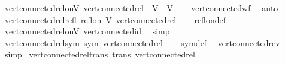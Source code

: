 \begin{isabellebody}
\isanewline
{}\isamarkupfalse%
\ vert{\isacharunderscore}{\kern0pt}connected{\isacharunderscore}{\kern0pt}rel{\isacharunderscore}{\kern0pt}on{\isacharunderscore}{\kern0pt}V{\isacharcolon}{\kern0pt}\ {\isachardoublequoteopen}vert{\isacharunderscore}{\kern0pt}connected{\isacharunderscore}{\kern0pt}rel\ {\isasymsubseteq}\ V\ {\isasymtimes}\ V{\isachardoublequoteclose}\isanewline
%
\isadelimproof
\ \ %
\endisadelimproof
%
\isatagproof
{}\isamarkupfalse%
\ vert{\isacharunderscore}{\kern0pt}connected{\isacharunderscore}{\kern0pt}wf\ \isamarkupfalse%
\ auto%
\endisatagproof
{\isafoldproof}%
%
\isadelimproof
\isanewline
%
\endisadelimproof
\isanewline
{}\isamarkupfalse%
\ vert{\isacharunderscore}{\kern0pt}connected{\isacharunderscore}{\kern0pt}rel{\isacharunderscore}{\kern0pt}refl{\isacharcolon}{\kern0pt}\ {\isachardoublequoteopen}refl{\isacharunderscore}{\kern0pt}on\ V\ vert{\isacharunderscore}{\kern0pt}connected{\isacharunderscore}{\kern0pt}rel{\isachardoublequoteclose}\isanewline
%
\isadelimproof
\ \ %
\endisadelimproof
%
\isatagproof
{}\isamarkupfalse%
\ refl{\isacharunderscore}{\kern0pt}on{\isacharunderscore}{\kern0pt}def\ \isamarkupfalse%
\ vert{\isacharunderscore}{\kern0pt}connected{\isacharunderscore}{\kern0pt}rel{\isacharunderscore}{\kern0pt}on{\isacharunderscore}{\kern0pt}V\ vert{\isacharunderscore}{\kern0pt}connected{\isacharunderscore}{\kern0pt}id\ \isamarkupfalse%
\ simp%
\endisatagproof
{\isafoldproof}%
%
\isadelimproof
\isanewline
%
\endisadelimproof
\isanewline
{}\isamarkupfalse%
\ vert{\isacharunderscore}{\kern0pt}connected{\isacharunderscore}{\kern0pt}rel{\isacharunderscore}{\kern0pt}sym{\isacharcolon}{\kern0pt}\ {\isachardoublequoteopen}sym\ vert{\isacharunderscore}{\kern0pt}connected{\isacharunderscore}{\kern0pt}rel{\isachardoublequoteclose}\isanewline
%
\isadelimproof
\ \ %
\endisadelimproof
%
\isatagproof
{}\isamarkupfalse%
\ sym{\isacharunderscore}{\kern0pt}def\ \isamarkupfalse%
\ vert{\isacharunderscore}{\kern0pt}connected{\isacharunderscore}{\kern0pt}rev\ \isamarkupfalse%
\ simp%
\endisatagproof
{\isafoldproof}%
%
\isadelimproof
\isanewline
%
\endisadelimproof
\isanewline
{}\isamarkupfalse%
\ vert{\isacharunderscore}{\kern0pt}connected{\isacharunderscore}{\kern0pt}rel{\isacharunderscore}{\kern0pt}trans{\isacharcolon}{\kern0pt}\ {\isachardoublequoteopen}trans\ vert{\isacharunderscore}{\kern0pt}connected{\isacharunderscore}{\kern0pt}rel{\isachardoublequoteclose}\isanewline

\end{isabellebody}
